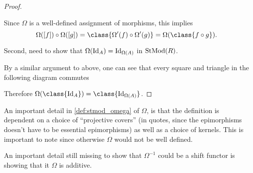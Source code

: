 \begin{proof}
\begin{center}
    \end{center}
    Since \( \Omega \) is a well-defined assignment of morphisms, this implies
    \[
        \Omega([f]) \circ \Omega([g]) = \class{\Omega'(f) \circ \Omega'(g)} = \Omega(\class{f \circ g}).
    \]

    Second, need to show that \( \Omega(\operatorname{Id}_A) = \operatorname{Id}_{\Omega(A)} \) in \( \operatorname{StMod}(R) \).

    By a similar argument to above, one can see that every square and triangle in the following diagram commutes
    \begin{center}
    \end{center}
    Therefore \( \Omega(\class{\Id_A}) = \class{\Id_{\Omega(A)}} \).
\end{proof}

An important detail in \autoref{def:stmod_omega} of \( \Omega \), is that the definition is dependent on a choice of ``projective covers'' (in quotes, since the epimorphisms doesn't have to be essential epimorphisms) as well as a choice of kernels. This is important to note since otherwise \( \Omega \) would not be well defined.

An important detail still missing to show that \( \Omega^{-1} \) could be a shift functor is showing that it \( \Omega \) is additive.

